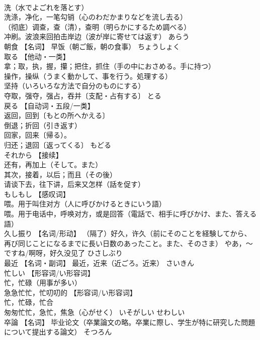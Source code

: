 \documentclass[8pt]{extreport}
\begin{document}
\begin{CJK}{UTF8}{min}
\\	洗（水でよごれを落とす） 
\\	洗涤，净化，一笔勾销（心のわだかまりなどを流し去る） 
\\	（彻底）调查，查（清），查明（明らかにするため調べる） 
\\	冲刷。波浪来回拍击岸边（波が岸に寄せては返す）	あらう	
\\	朝食	【名词】 早饭（朝ご飯，朝の食事）	ちょうしょく	
\\	取る	【他动・一类】 
\\	拿；取，执，握，攥；把住，抓住（手の中におさめる。手に持つ） 
\\	操作，操纵（うまく動かして、事を行う。処理する） 
\\	坚持（いろいろな方法で自分のものにする） 
\\	夺取，强夺，强占，吞并〔支配・占有する〕	とる	
\\	戻る	【自动词・五段/一类】 
\\	返回，回到〔もとの所へかえる〕 
\\	倒退；折回（引き返す） 
\\	回家，回来〔帰る）。 
\\	归还；退回〔返ってくる〕	もどる	
\\	それから	【接续】 
\\	还有，再加上（そして。また） 
\\	其次，接着，以后；而且（その後） 
\\	请谈下去，往下讲，后来又怎样（話を促す）		
\\	もしもし	【感叹词】 
\\	喂。用于叫住对方（人に呼びかけるときにいう語） 
\\	喂。用于电话中，呼唤对方，或是回答（電話で、相手に呼びかけ、また、答える語）		
\\	久し振り	【名词/形动】 （隔了）好久，许久（前にそのことを経験してから、再び同じことになるまでに長い日数のあったこと。また、そのさま） やあ，〜ですね/啊呀，好久没见了	ひさしぶり	
\\	最近	【名词・副词】 最近，近来（近ごろ。近来）	さいきん	
\\	忙しい	【形容词/い形容词】 
\\	忙，忙碌（用事が多い） 
\\	急急忙忙，忙叨叨的 【形容词/い形容词】 
\\	忙，忙碌，忙合 
\\	匆匆忙忙，急忙，焦急（心がせく）	いそがしい せわしい	
\\	卒論	【名词】 毕业论文（卒業論文の略。卒業に際し、学生が特に研究した問題について提出する論文）	そつろん	

\end{CJK}
\end{document}
